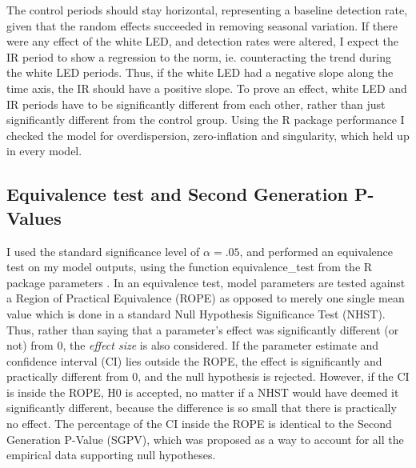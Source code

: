 
The control periods should stay horizontal, representing a baseline detection rate, given that the random effects succeeded in removing seasonal variation. 
If there were any effect of the white LED, and detection rates were altered, I expect the IR period to show a regression to the norm, ie. counteracting the trend during the white LED periods.
Thus, if the white LED had a negative slope along the time axis, the IR should have a positive slope. %
To prove an effect, white LED and IR periods have to be significantly different from each other, rather than just significantly different from the control group.
Using the R package performance \autocite{R-performance} I checked the model for overdispersion, zero-inflation and singularity, which held up in every model.




\subsection*{Equivalence test and Second Generation P-Values}
I used the standard significance level of $\alpha = .05$, and performed an equivalence test on my model outputs, using the function equivalence\_test from the R package parameters \autocite{R-parameters}.
In an equivalence test, model parameters are tested against a Region of Practical Equivalence (ROPE) as opposed to merely one single mean value which is done in a standard Null Hypothesis Significance Test (NHST).
Thus, rather than saying that a parameter's effect was significantly different (or not) from 0, the \emph{effect size} is also considered.
If the parameter estimate and confidence interval (CI) lies outside the ROPE, the effect is significantly and practically different from 0, and the null hypothesis is rejected.
However, if the CI is inside the ROPE, H0 is accepted, no matter if a NHST would have deemed it significantly different, because the difference is so small that there is practically no effect.
The percentage of the CI inside the ROPE is identical to the Second Generation P-Value (SGPV), which was proposed %
 as a way to account for all the empirical data supporting null hypotheses. %


